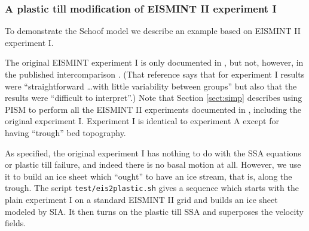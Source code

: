 \documentclass[11pt,final]{amsart}
\begin{document}
\subsubsection*{A plastic till modification of EISMINT II experiment I}  To demonstrate the Schoof model we describe an example based on EISMINT II experiment I.

The original EISMINT experiment I is only documented in \cite{EISIIdescribe}, but not, however, in the published intercomparison \cite{EISMINT00}.  (That reference says that for experiment I results were ``straightforward \dots with little variability between groups'' but also that the results were ``difficult to interpret''.)  Note that Section \ref{sect:simp} describes using PISM to perform all the EISMINT II experiments documented in \cite{EISIIdescribe}, including the original experiment I.  Experiment I is identical to experiment A except for having ``trough'' bed topography.  

As specified, the original experiment I has nothing to do with the SSA equations or plastic till failure, and indeed there is no basal motion at all.  However, we use it to build an ice sheet which ``ought'' to have an ice stream, that is, along the trough.  The script \verb|test/eis2plastic.sh| gives a sequence which starts with the plain experiment I on a standard EISMINT II grid and builds an ice sheet modeled by SIA.  It then turns on the plastic till SSA and superposes the velocity fields.

\end{document}
